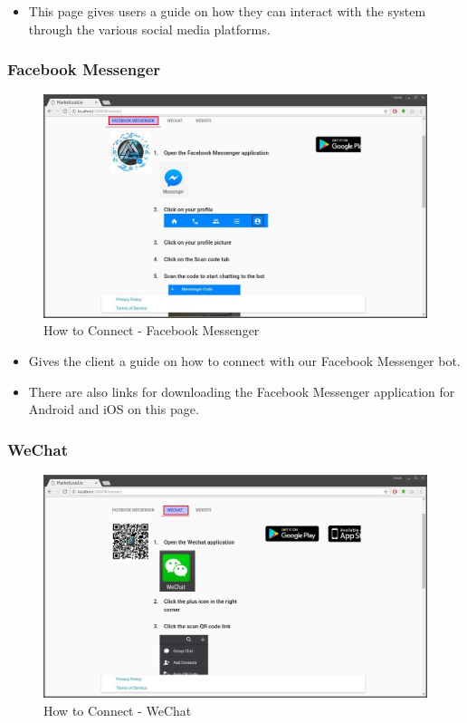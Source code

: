 \documentclass{article}
\begin{document}
			\begin{itemize}
				\item This page gives users a guide on how they can interact with the system through the various social media platforms.
			\end{itemize}

			\subsubsection{Facebook Messenger}
				\begin{figure}[H]
					\includegraphics[width=\textwidth]{images/how_to_connect_facebook_messenger.jpg}
					\caption{How to Connect - Facebook Messenger}
					\label{fig:howToConnectFacebookMessenger}
				\end{figure}

				\begin{itemize}
					\item Gives the client a guide on how to connect with our Facebook Messenger bot.
					\item There are also links for downloading the Facebook Messenger application for Android and iOS on this page.
				\end{itemize}

			\subsubsection{WeChat}
				\begin{figure}[H]
					\includegraphics[width=\textwidth]{images/how_to_connect_wechat.jpg}
					\caption{How to Connect - WeChat}
					\label{fig:howToConnectWeChat}
				\end{figure}
\end{document}
